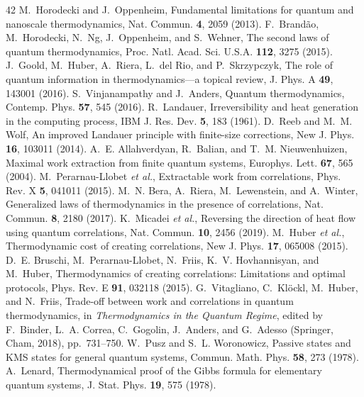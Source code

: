 \begin{thebibliography}{42}
 M.~Horodecki and J.~Oppenheim, Fundamental limitations for quantum and nanoscale thermodynamics, Nat. Commun. \textbf{4}, 2059 (2013).
 F.~Brand\~{a}o, M.~Horodecki, N.~Ng, J.~Oppenheim, and S.~Wehner, The second laws of quantum thermodynamics, Proc. Natl. Acad. Sci. U.S.A. \textbf{112}, 3275 (2015).
 J.~Goold, M.~Huber, A.~Riera, L.~del Rio, and P.~Skrzypczyk, The role of quantum information in thermodynamics---a topical review, J. Phys. A \textbf{49}, 143001 (2016).
 S.~Vinjanampathy and J.~Anders, Quantum thermodynamics, Contemp. Phys. \textbf{57}, 545 (2016).
 R.~Landauer, Irreversibility and heat generation in the computing process, IBM J. Res. Dev. \textbf{5}, 183 (1961).
 D.~Reeb and M.~M. Wolf, An improved Landauer principle with finite-size corrections, New J. Phys. \textbf{16}, 103011 (2014).
 A.~E. Allahverdyan, R.~Balian, and T.~M. Nieuwenhuizen, Maximal work extraction from finite quantum systems, Europhys. Lett. \textbf{67}, 565 (2004).
 M.~Perarnau-Llobet \textit{et al.}, Extractable work from correlations, Phys. Rev. X \textbf{5}, 041011 (2015).
 M.~N. Bera, A.~Riera, M.~Lewenstein, and A.~Winter, Generalized laws of thermodynamics in the presence of correlations, Nat. Commun. \textbf{8}, 2180 (2017).
 K.~Micadei \textit{et al.}, Reversing the direction of heat flow using quantum correlations, Nat. Commun. \textbf{10}, 2456 (2019).
 M.~Huber \textit{et al.}, Thermodynamic cost of creating correlations, New J. Phys. \textbf{17}, 065008 (2015).
 D.~E. Bruschi, M.~Perarnau-Llobet, N.~Friis, K.~V. Hovhannisyan, and M.~Huber, Thermodynamics of creating correlations: Limitations and optimal protocols, Phys. Rev. E \textbf{91}, 032118 (2015).
 G.~Vitagliano, C.~Kl\"{o}ckl, M.~Huber, and N.~Friis, Trade-off between work and correlations in quantum thermodynamics, in \textit{Thermodynamics in the Quantum Regime}, edited by F.~Binder, L.~A. Correa, C.~Gogolin, J.~Anders, and G.~Adesso (Springer, Cham, 2018), pp.~731--750.
 W.~Pusz and S.~L. Woronowicz, Passive states and KMS states for general quantum systems, Commun. Math. Phys. \textbf{58}, 273 (1978).
 A.~Lenard, Thermodynamical proof of the Gibbs formula for elementary quantum systems, J. Stat. Phys. \textbf{19}, 575 (1978).

\end{thebibliography}
